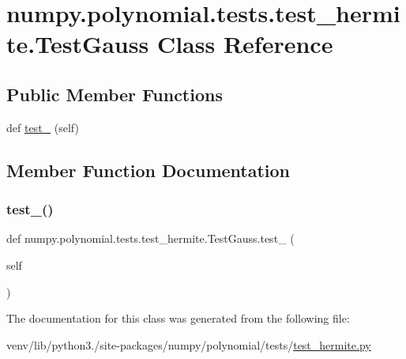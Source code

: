 \hypertarget{classnumpy_1_1polynomial_1_1tests_1_1test__hermite_1_1TestGauss}{}\section{numpy.\+polynomial.\+tests.\+test\+\_\+hermite.\+Test\+Gauss Class Reference}
\label{classnumpy_1_1polynomial_1_1tests_1_1test__hermite_1_1TestGauss}
\subsection*{Public Member Functions}
\begin{DoxyCompactItemize}
\item 
def \hyperlink{classnumpy_1_1polynomial_1_1tests_1_1test__hermite_1_1TestGauss_a671df37412cd93b574780bf7d9e225e5}{test\+\_} (self)
\end{DoxyCompactItemize}


\subsection{Member Function Documentation}
\mbox{\label{classnumpy_1_1polynomial_1_1tests_1_1test__hermite_1_1TestGauss_a671df37412cd93b574780bf7d9e225e5}} 
\subsubsection{\texorpdfstring{test\+\_()}{test\_100()}}
{\footnotesize\ttfamily def numpy.\+polynomial.\+tests.\+test\+\_\+hermite.\+Test\+Gauss.\+test\+\_ (\begin{DoxyParamCaption}\item[{}]{self }\end{DoxyParamCaption})}



The documentation for this class was generated from the following file\+:\begin{DoxyCompactItemize}
\item 
venv/lib/python3./site-\/packages/numpy/polynomial/tests/\hyperlink{test__hermite_8py}{test\+\_\+hermite.\+py}\end{DoxyCompactItemize}
